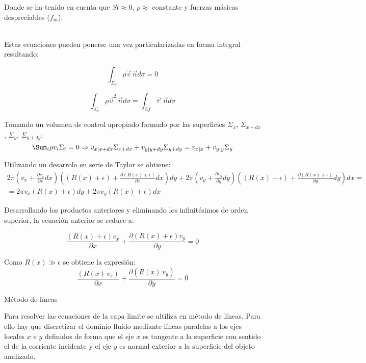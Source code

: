 \documentclass[11pt,a4paper]{article}
\begin{document}
Donde se ha tenido en cuenta que $St \approx 0$, $\rho \approx$ constante y fuerzas másicas despreciables ($f_{m}$).

\\

Estas ecuaciones pueden ponerse una vez particularizadas en forma integral resultando:

\[\int_{\Sigma_{c}} \rho \vec{v} \, \vec{n} d\sigma=0\]

\[\int_{\Sigma_{c}} \rho \vec{v}^{2} \, \vec{n} d\sigma = \int_{\Sigma{f}} \bar{\bar{\tau}}' \,  \vec{n} d\sigma\]

Tomando un volumen de control apropiado formado por las superficies $\Sigma_{x}$, $\Sigma_{x+dx}$, $\Sigma_{y}$, $\Sigma_{y+dy}$:
\[\Sum_{i} \rho v_{i} \Sigma_{i}= 0 \Rightarrow v_{x|x+dx} \Sigma_{x+dx} + v_{y|y+dy} \Sigma_{y+dy}=v_{x|x} + v_{y|y} \Sigma_{y}\]

Utilizando un desarrolo en serie de Taylor se obtiene:
\begin{multline*}
\displaystyle 2\pi\left(  v_{x} + \frac{\partial v_{x}}{\partial{x}}dx\right) \left( (R(x) + \epsilon)+\frac{\partial(R(x)+\epsilon)}{\partial{x}}dx \right) dy + 2\pi \left( v_{y} + \frac{\partial{v_{y}}}{\partial{y}} dy \right) \left( (R(x)+\epsilon) + \frac{\partial(R(x)+\epsilon)}{\partial y} dy \right) dx= \\=
2\pi v_{x}( R(x)+\epsilon)dy + 2\pi v_{y}(R(x)+\epsilon)dx
\end{multline*} 

Desarrollando los productos anteriores y eliminando los infinitésimos de orden superior, la ecuación anterior se reduce a:

\[\frac{(R(x)+\epsilon) v_{x}}{\partial {x}} + \frac{\partial(R(x) + \epsilon) v_{y}}{\partial y}=0\]

Como $R(x) \gg \epsilon$ se obtiene la expresión:
\[\frac{(R(x)\, v_{s})}{\partial x} + \frac{\partial (R(x)\, v_{y})}{\partial y}=0\]

\newpage



\begin{center}
  {\Large Método de líneas}
\end{center}

Para resolver las ecuaciones de la capa límite se ultiliza en método de líneas. Para ello hay que discretizar el dominio fluido mediante líneas paralelas a los ejes locales $x$ e $y$ definidos de forma que el eje $x$ es tangente a la superficie con sentido el de la corriente incidente y el eje $y$ es normal exterior a la superficie del objeto analizado.
\end{document}

